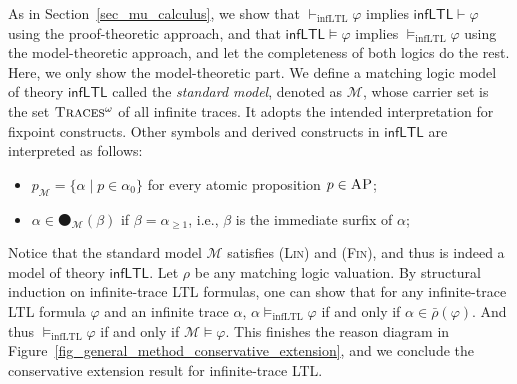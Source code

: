 \documentclass[acmsmall,review,anonymous]{acmart}
\newcommand{\MM}{\mathcal{M}}
\newcommand{\barrho}{\bar{\rho}}
\newcommand{\MLinfLTL}{\mathsf{infLTL}}
\newcommand{\infLTL}{\mathrm{infLTL}}
\newcommand{\prule}[1]{\textsc{(#1)}}
\newcommand{\AP}{\textsc{AP}}
\newcommand{\wnext}{{\medcirc}}
\newcommand{\snext}{{\medbullet}}
\newcommand{\always}{{\square}}
\newcommand{\eventually}{{\lozenge}}
\newcommand{\Us}{\mathbin{\mathsf{U}_s}}
\newcommand{\infTraces}{\textsc{Traces$^\omega$}\xspace}
\newcommand{\Inf}{\prule{Inf}\xspace}
\newcommand{\Fin}{\prule{Fin}\xspace}
\newcommand{\Lin}{\prule{Lin}\xspace}
\begin{document}
%


As in Section~\ref{sec_mu_calculus}, we show
that
$\vdash_\infLTL \varphi$ implies $\MLinfLTL \vdash \varphi$ using the proof-theoretic approach,
and that
$\MLinfLTL \vDash \varphi$ implies $\vDash_\infLTL\varphi$ using the model-theoretic approach,
and let the completeness of both logics do the rest.
Here, we only show the model-theoretic part.
We define a matching logic model of theory $\MLinfLTL$ called the \emph{standard model},
denoted as $\MM$, whose carrier set is the set $\infTraces$ of all infinite traces.
It adopts the intended interpretation for fixpoint constructs.
Other symbols and derived constructs in $\MLinfLTL$ are interpreted as follows:
\begin{itemize}
\item $p_\MM = \{ \alpha \mid p \in \alpha_0 \}$ for every atomic proposition $p \in \AP$;
\item $\alpha \in \snext_\MM(\beta)$ if $\beta = \alpha_{\ge 1}$, i.e.,
      $\beta$ is the immediate surfix of $\alpha$;
\end{itemize}
Notice that the standard model $\MM$ satisfies \Lin and \Fin, and thus is indeed a model
of theory $\MLinfLTL$.
Let $\rho$ be any matching logic valuation.
By structural induction on infinite-trace LTL formulas,
one can show that for any infinite-trace LTL formula $\varphi$ and an infinite trace $\alpha$,
$\alpha \vDash_\infLTL \varphi$ if and only if $\alpha \in \barrho(\varphi)$.
And thus $\vDash_\infLTL \varphi$ if and only if $\MM \vDash \varphi$.
This finishes the reason diagram in Figure~\ref{fig_general_method_conservative_extension},
and we conclude the conservative extension result for infinite-trace LTL.
\end{document}

